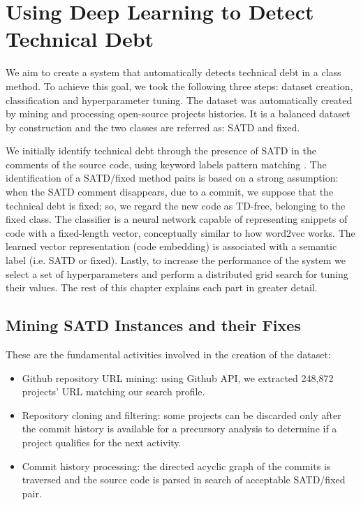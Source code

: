 

\chapter{Using Deep Learning to Detect Technical Debt}

We aim to create a system that automatically detects technical debt in a class method. To achieve this goal, we took the following three steps: dataset creation, classification and hyperparameter tuning.
The dataset was automatically created by mining and processing open-source projects histories. It is a balanced dataset by construction and the two classes are referred as: SATD and fixed.

We initially identify technical debt through the presence of SATD in the comments of the source code, using keyword labels pattern matching \cite{potdar2014exploratory} \cite{rantala2020prevalence}.
The identification of a SATD/fixed method pairs is based on a strong assumption: when the SATD comment disappears, due to a commit, we suppose that the technical debt is fixed; so, we regard the new code as TD-free, belonging to the fixed class.
The classifier is a neural network capable of representing snippets of code with a fixed-length vector, conceptually similar to how word2vec works. The learned vector representation (code embedding) is associated with a semantic label (i.e. SATD or fixed).
Lastly, to increase the performance of the system we select a set of hyperparameters and perform a distributed grid search for tuning their values. The rest of this chapter explains each part in greater detail.

\section{Mining SATD Instances and their Fixes}

These are the fundamental activities involved in the creation of the dataset:
\begin{itemize}
    \item Github repository URL mining: using Github API, we extracted 248,872 projects' URL matching our search profile.
    \item Repository cloning and filtering: some projects can be discarded only after the commit history is available for a precursory analysis to determine if a project qualifies for the next activity.
    \item Commit history processing: the directed acyclic graph of the commits is traversed and the source code is parsed in search of acceptable SATD/fixed pair.
\end{itemize}

